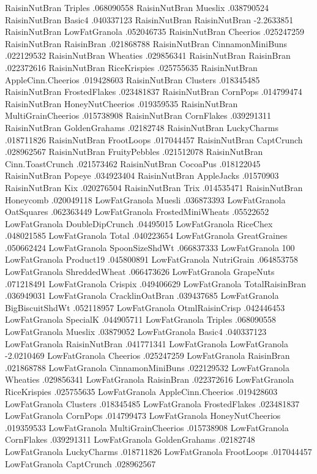 RaisinNutBran	Triples	.068090558
RaisinNutBran	Mueslix	.038790524
RaisinNutBran	Basic4	.040337123
RaisinNutBran	RaisinNutBran	-2.2633851
RaisinNutBran	LowFatGranola	.052046735
RaisinNutBran	Cheerios	.025247259
RaisinNutBran	RaisinBran	.021868788
RaisinNutBran	CinnamonMiniBuns	.022129532
RaisinNutBran	Wheaties	.029856341
RaisinNutBran	RaisinBran	.022372616
RaisinNutBran	RiceKrispies	.025755635
RaisinNutBran	AppleCinn.Cheerios	.019428603
RaisinNutBran	Clusters	.018345485
RaisinNutBran	FrostedFlakes	.023481837
RaisinNutBran	CornPops	.014799474
RaisinNutBran	HoneyNutCheerios	.019359535
RaisinNutBran	MultiGrainCheerios	.015738908
RaisinNutBran	CornFlakes	.039291311
RaisinNutBran	GoldenGrahams	.02182748
RaisinNutBran	LuckyCharms	.018711826
RaisinNutBran	FrootLoops	.017044457
RaisinNutBran	CaptCrunch	.028962567
RaisinNutBran	FruityPebbles	.021512078
RaisinNutBran	Cinn.ToastCrunch	.021573462
RaisinNutBran	CocoaPus	.018122045
RaisinNutBran	Popeye	.034923404
RaisinNutBran	AppleJacks	.01570903
RaisinNutBran	Kix	.020276504
RaisinNutBran	Trix	.014535471
RaisinNutBran	Honeycomb	.020049118
LowFatGranola	Muesli	.036873393
LowFatGranola	OatSquares	.062363449
LowFatGranola	FrostedMiniWheats	.05522652
LowFatGranola	DoubleDipCrunch	.04495015
LowFatGranola	RiceChex	.048021585
LowFatGranola	Total	.040223654
LowFatGranola	GreatGraines	.050662424
LowFatGranola	SpoonSizeShdWt	.066837333
LowFatGranola	100%
LowFatGranola	Product19	.045800891
LowFatGranola	NutriGrain	.064853758
LowFatGranola	ShreddedWheat	.066473626
LowFatGranola	GrapeNuts	.071218491
LowFatGranola	Crispix	.049406629
LowFatGranola	TotalRaisinBran	.036949031
LowFatGranola	CracklinOatBran	.039437685
LowFatGranola	BigBiscuitShdWt	.052118957
LowFatGranola	OtmlRaisinCrisp	.042446453
LowFatGranola	SpecialK	.044905711
LowFatGranola	Triples	.068090558
LowFatGranola	Mueslix	.03879052
LowFatGranola	Basic4	.040337123
LowFatGranola	RaisinNutBran	.041771341
LowFatGranola	LowFatGranola	-2.0210469
LowFatGranola	Cheerios	.025247259
LowFatGranola	RaisinBran	.021868788
LowFatGranola	CinnamonMiniBuns	.022129532
LowFatGranola	Wheaties	.029856341
LowFatGranola	RaisinBran	.022372616
LowFatGranola	RiceKrispies	.025755635
LowFatGranola	AppleCinn.Cheerios	.019428603
LowFatGranola	Clusters	.018345485
LowFatGranola	FrostedFlakes	.023481837
LowFatGranola	CornPops	.014799473
LowFatGranola	HoneyNutCheerios	.019359533
LowFatGranola	MultiGrainCheerios	.015738908
LowFatGranola	CornFlakes	.039291311
LowFatGranola	GoldenGrahams	.02182748
LowFatGranola	LuckyCharms	.018711826
LowFatGranola	FrootLoops	.017044457
LowFatGranola	CaptCrunch	.028962567
